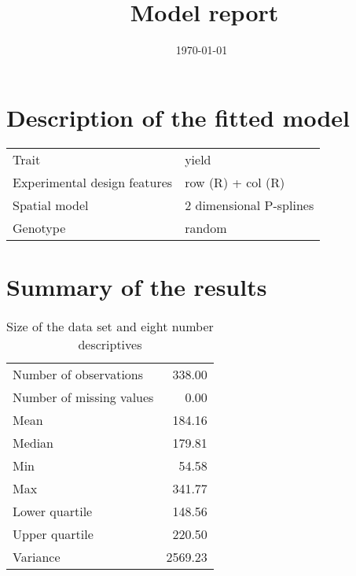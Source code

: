 \documentclass[a4paper,11pt]{article}\usepackage[]{graphicx}\usepackage[]{color}
\title{Model report}%
\author{\vspace{-5ex}}
\date{\today\ \currenttime} %
\begin{document}



\maketitle

\singlespacing

\section{Description of the fitted model}

\begin{table}[ht]
\begin{flushleft}
\begin{tabular}{ll}
  Trait & yield \\ 
  Experimental design features & row (R) + col (R) \\ 
  Spatial model & 2 dimensional P-splines \\ 
  Genotype & random \\ 
  \end{tabular}
\label{modelDescription}
\end{flushleft}
\end{table}


\section{Summary of the results}

\begin{table}[ht]
\begin{flushleft}
\caption{Size of the data set and eight number descriptives} 
\label{modelSummary}
\begin{tabular}{lr}
  \hline
  \hline
Number of observations & 338.00 \\ 
  Number of missing values & 0.00 \\ 
  Mean & 184.16 \\ 
  Median & 179.81 \\ 
  Min & 54.58 \\ 
  Max & 341.77 \\ 
  Lower quartile & 148.56 \\ 
  Upper quartile & 220.50 \\ 
  Variance & 2569.23 \\ 
   \hline
\end{tabular}
\end{flushleft}
\end{table}
\end{document}
